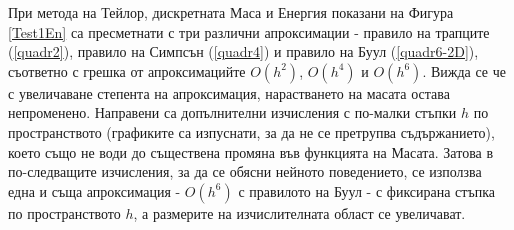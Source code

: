 \documentclass{article}
\newcommand{\rf}[1]{(\ref{#1})}
\begin{document}
При метода на Тейлор, дискретната Маса и Енергия показани на Фигура \ref{Test1En} са пресметнати с три различни апроксимации - правило на трапците \rf{quadr2}, правило на Симпсън \rf{quadr4} и правило на Буул \rf{quadr6-2D}, съответно с грешка от апроксимацийте $O(h^2)$, $O(h^4)$ и $O(h^6)$.  
Вижда се че с увеличаване степента на апроксимация, нарастването на масата остава непроменено. Направени са допълнителни изчисления с по-малки стъпки $h$ по пространството (графиките са изпуснати, за да не се претрупва съдържанието), което също не води до съществена промяна във функцията на Масата. Затова в по-следващите изчисления, за да се обясни нейното поведението, се използва една и съща апроксимация - $O(h^6)$ с правилото на Буул - с фиксирана стъпка по пространството $h$, а размерите на изчислителната област се увеличават.
\iffalse
\end{document}
